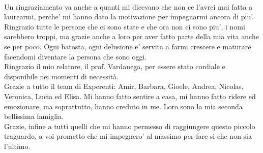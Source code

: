 {\\
Un ringraziamento va anche a quanti mi dicevano che non ce l'avrei mai fatta a laurearmi, perche' mi hanno dato la motivazione per impegnarmi ancora di piu'.
\\
Ringrazio tutte le persone che ci sono state e che ora non ci sono piu', i nomi sarebbero troppi, ma grazie anche a loro per aver fatto parte della mia vita anche se per poco. Ogni batosta, ogni delusione e' servita a farmi crescere e maturare facendomi diventare la persona che sono oggi.
\\
Ringrazio il mio relatore, il prof. Vardanega, per essere stato cordiale e disponibile nei momenti di necessità.
\\
Grazie a tutto il team di Experenti: Amir, Barbara, Gioele, Andrea, Nicolas, Veronica, Lucia ed Elisa. Mi hanno fatto sentire a casa, mi hanno fatto ridere ed emozionare, ma soprattutto, hanno creduto in me.
Loro sono la mia seconda bellissima famiglia.
\\
Grazie, infine a tutti quelli che mi hanno permesso di raggiungere questo piccolo traguardo, a voi prometto che mi impegnero' al massimo per fare si che non sia l'ultimo.
}